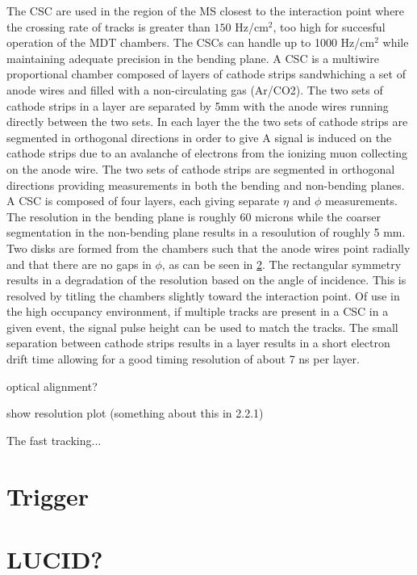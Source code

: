 The CSC are used in the region of the MS closest to the interaction
point where the crossing rate of tracks 
is greater than $150$ Hz/cm$^2$, 
too high for succesful operation of the MDT chambers.
The CSCs can handle up to 1000 Hz/cm$^2$
while maintaining adequate  precision in the bending plane.
A CSC is a multiwire proportional chamber
composed of layers of cathode strips sandwhiching 
a set of anode wires and filled with a non-circulating gas (Ar/CO2).
The two sets of cathode strips in a layer are separated by 5mm
with the anode wires running directly between the two sets.
In each layer the the two sets of cathode strips are segmented in
orthogonal directions in order to give 
A signal is induced on the cathode strips due to an avalanche
of electrons from the ionizing muon collecting on the anode wire.
The two sets of cathode strips are segmented in orthogonal directions
providing measurements in both the bending and non-bending planes. 
A CSC is composed of four layers, each giving separate $\eta$ and
$\phi$ measurements.
The resolution in the bending plane is roughly 60 microns
while the coarser segmentation in the non-bending plane 
results in a  resoulution of  roughly 5 mm.
Two disks are formed from the chambers such that the anode wires
point radially and that there are no gaps in $\phi$, as
can be seen in \fig\ref{}. The rectangular symmetry 
results in a degradation of the resolution based on the angle of incidence.
This is resolved by titling the chambers slightly toward the interaction point.
Of use in the high occupancy environment, 
if multiple tracks are present in a CSC in a given event, 
the signal pulse height can be used to match the tracks.
The small separation between cathode strips results in a layer
results in a short electron drift time allowing for a good
timing resolution of about 7 ns per layer.

optical alignment?

show resolution plot (something about this in 2.2.1)

The fast tracking...





\section{Trigger}

\section{LUCID?}
